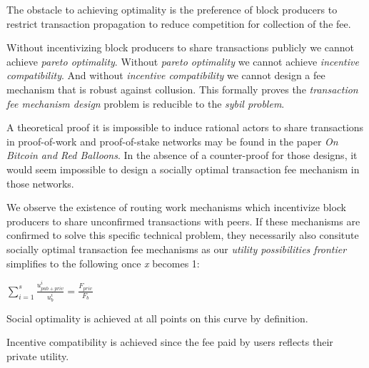\documentclass[oneside]{article}   	%
\begin{document}
The obstacle to achieving optimality is the preference of block producers to restrict transaction propagation to reduce competition for collection of the fee.

Without incentivizing block producers to share transactions publicly we cannot achieve \textit{pareto optimality}. Without \textit{pareto optimality} we cannot achieve \textit{incentive compatibility}. And without \textit{incentive compatibility} we cannot design a fee mechanism that is robust against collusion. This formally proves the \textit{transaction fee mechanism design} problem is reducible to the \textit{sybil problem}.

A theoretical proof it is impossible to induce rational actors to share transactions in proof-of-work and proof-of-stake networks may be found in the paper \textit{On Bitcoin and Red Balloons}. In the absence of a counter-proof for those designs, it would seem impossible to design a socially optimal transaction fee mechanism in those networks.

We observe the existence of routing work mechanisms which incentivize block producers to share unconfirmed transactions with peers. If these mechanisms are confirmed to solve this specific technical problem, they necessarily also consitute socially optimal transaction fee mechanisms as our \textit{utility possibilities frontier} simplifies to the following once \textit{x} becomes 1:

\LARGE
\begin{adjustwidth}{1.5em}{1.5em} 
\begin{math}
\sum_{i=1}^{s} \frac{u_{{pub}+{priv}}^i}{u_b^i} = \frac{F_{{priv}}}{F_b}
\end{math}
\end{adjustwidth}
\normalsize

Social optimality is achieved at all points on this curve by definition.

Incentive compatibility is achieved since the fee paid by users reflects their private utility.

\pagebreak

\nocite{*}
\end{document}
